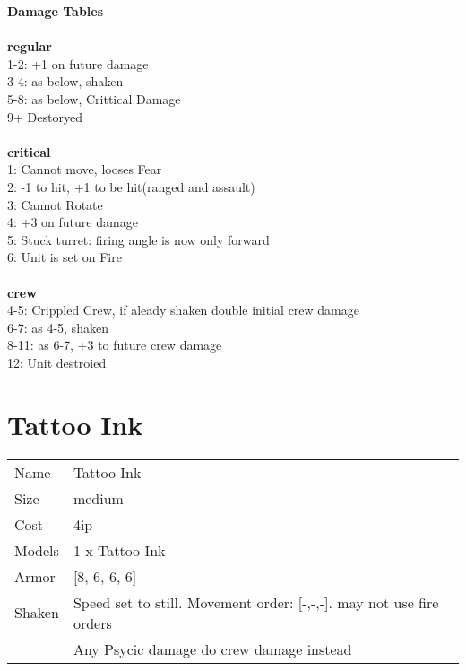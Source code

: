 {\bf Damage Tables} \\
\ \\ {\bf regular } \\
1-2: +1 on future damage \\
3-4: as below, shaken \\
5-8: as below, Crittical Damage \\
9+ Destoryed \\
\ \\ {\bf critical } \\
1: Cannot move, looses Fear \\
2: -1 to hit, +1 to be hit(ranged and assault) \\
3: Cannot Rotate \\
4: +3 on future damage \\
5: Stuck turret: firing angle is now only forward \\
6: Unit is set on Fire \\
\ \\ {\bf crew } \\
4-5: Crippled Crew, if aleady shaken double initial crew damage \\
6-7: as 4-5, shaken \\
8-11: as 6-7, +3 to future crew damage \\
12: Unit destroied \\










\pagebreak\pagebreak

\section{ Tattoo Ink }

\begin{tabular}{ll}
  Name & Tattoo Ink \\
  Size & medium\\
  Cost & 4ip\\
  Models & 1 x Tattoo Ink\\
  Armor & [8, 6, 6, 6]\\
  Shaken & Speed set to still. Movement order: [-,-,-]. may not use fire orders \\ & Any Psycic damage do crew damage instead\\
\end{tabular}

\noindent 


